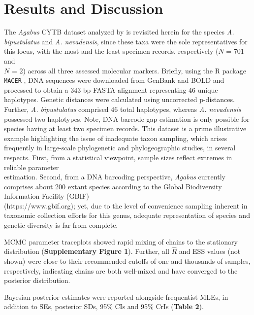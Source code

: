 \documentclass[12pt]{article}
\begin{document}
\section{Results and Discussion}

The \textit{Agabus} CYTB dataset analyzed by \citet{phillips2024measure} is revisited herein for the species \textit{A. bipustulatus} and \textit{A. nevadensis}, since these taxa were the sole representatives for this locus, with the most and the least specimen records, respectively ($N$ = 701 and \\ $N$ = 2) across all three assessed molecular markers. Briefly, using the R package {\tt MACER} \citep{young2021macer}, DNA sequences were downloaded from GenBank and BOLD and processed to obtain a 343 bp FASTA alignment representing 46 unique haplotypes. Genetic distances were calculated using uncorrected p-distances. Further, \textit{A. bipustulatus} comprised 46 total haplotypes, whereas \textit{A. nevadensis} possessed two haplotypes. Note, DNA barcode gap estimation is only possible for species having at least two specimen records. This dataset is a prime illustrative example highlighting the issue of inadequate taxon sampling, which arises frequently in large-scale phylogenetic and phylogeographic studies, in several respects. First, from a statistical viewpoint, sample sizes reflect extremes in reliable parameter \\ estimation. Second, from a DNA barcoding perspective, \textit{Agabus} currently comprises about 200 extant species according to the Global Biodiversity Information Facility (GBIF) \\ (https://www.gbif.org); yet, due to the level of convenience sampling inherent in taxonomic collection efforts for this genus, adequate representation of species and genetic diversity is far from complete. 

MCMC parameter traceplots showed rapid mixing of chains to the stationary distribution (\textbf{Supplementary Figure 1}). Further, all $\hat{R}$ and ESS values (not shown) were close to their recommended cutoffs of one and thousands of samples, respectively, indicating chains are both well-mixed and have converged to the posterior distribution.  

Bayesian posterior estimates were reported alongside frequentist MLEs, in addition to SEs, posterior SDs, 95\% CIs and 95\% CrIs (\textbf{Table 2}).
\end{document}
